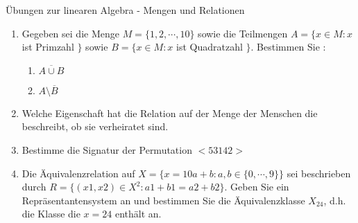 \documentclass[a4paper]{article}
\begin{document}
Übungen zur linearen Algebra - Mengen und Relationen
\begin{enumerate}
\item Gegeben sei die Menge $M = \{ 1, 2, \cdots , 10 \}$ sowie die Teilmengen $A = \{ x \in M : x $ ist Primzahl $\} $ sowie $B = \{ x \in M : x $ ist Quadratzahl $\}$. Bestimmen Sie : 
\begin{enumerate}
\item $\overline{ A \cup B }$ 
\item $A  \setminus \overline{B} $
\end{enumerate}
\item Welche Eigenschaft hat die Relation auf der Menge der Menschen die beschreibt, ob sie verheiratet sind.
\item Bestimme die Signatur der Permutation $<53142>$
\item Die Äquivalenzrelation auf $X = \{ x = 10a + b : a, b \in \{ 0, \cdots , 9 \} \}$ sei beschrieben durch  $R = \{ (x1, x2) \in X^2  : a1 + b1 = a2 + b2 \}$. Geben Sie ein Repräsentantensystem an und bestimmen Sie die Äquivalenzklasse $X_{24}$, d.h. die Klasse die $x = 24$ enthält an.



\end{enumerate}
\end{document}
